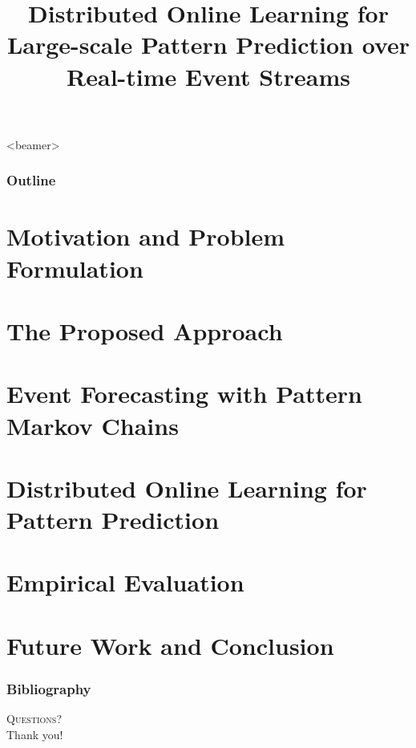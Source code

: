 \documentclass{beamer}
\title{	Distributed Online Learning for Large-scale Pattern Prediction over Real-time Event Streams}
\begin{document}



	\begin{frame}<beamer>
		\frametitle{Outline}
		\tableofcontents
	\end{frame}


\section{Motivation and Problem Formulation}

\section{The Proposed Approach}

\section{Event Forecasting with Pattern Markov Chains}

\section{Distributed Online Learning for Pattern Prediction}

\section{Empirical Evaluation\\}

\section{Future Work and Conclusion}




\begin{frame}[allowframebreaks]
	\frametitle{Bibliography}
	 
	
	
\end{frame}


\begin{frame}
	
	\centering
	
	\textsc{\Large Questions?}\\[1.5cm]
	
	Thank you!
\end{frame}
\end{document}
